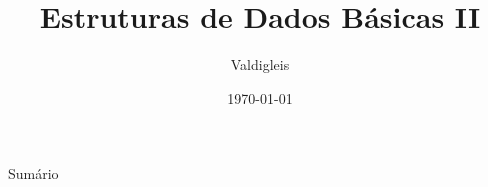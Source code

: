 \documentclass[presentation,t]{beamer}
\title[DIM0117]{Estruturas de Dados Básicas II}
\date{\today}
\author[Valdigleis]{Valdigleis\inst{1}}
\institute[UFRN]{
	\inst{1}%
        Universidade Federal do Rio Grande do Norte\\
        Centro de Ciência Exatas e da Terra\\
        Departamento de Informática e Matemática Aplicada\\
	\url{valdigleis@dimap.ufrn.br}\\
	\vspace{0.25cm}
}
\begin{document}
\frame{\titlepage}
\section[]{}
\begin{frame}{Sumário}
	\tableofcontents
\end{frame}




\end{document}
